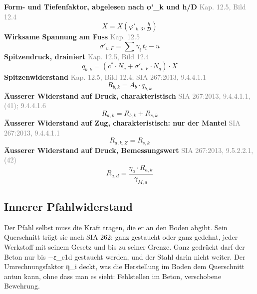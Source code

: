 \documentclass[11pt,a4paper]{article}
\newcommand{\normref}[1]{{\small\textcolor{gray}{#1}}}
\begin{document}
\noindent\textbf{Form- und Tiefenfaktor, abgelesen nach φ'\_k und h/D} \hfill \normref{Kap. 12.5, Bild 12.4}
\begin{equation*}
X = X\left(\varphi'_{k,3}, \tfrac{h}{D}\right)
\end{equation*}
\noindent\textbf{Wirksame Spannung am Fuss} \hfill \normref{Kap. 12.5}
\begin{equation*}
\sigma'_{v,F} = \sum \gamma_i \, t_i - u
\end{equation*}
\noindent\textbf{Spitzendruck, drainiert} \hfill \normref{Kap. 12.5, Bild 12.4}
\begin{equation*}
q_{b,k} = \left(c^{*} \cdot N_c + \sigma'_{v,F} \cdot N_q\right) \cdot X
\end{equation*}
\noindent\textbf{Spitzenwiderstand} \hfill \normref{Kap. 12.5, Bild 12.4; SIA 267:2013, 9.4.4.1.1}
\begin{equation*}
R_{b,k} = A_b \cdot q_{b,k}
\end{equation*}
\noindent\textbf{Äusserer Widerstand auf Druck, charakteristisch} \hfill \normref{SIA 267:2013, 9.4.4.1.1, (41); 9.4.4.1.6}
\begin{equation*}
R_{a,k} = R_{b,k} + R_{s,k}
\end{equation*}
\noindent\textbf{Äusserer Widerstand auf Zug, charakteristisch: nur der Mantel} \hfill \normref{SIA 267:2013, 9.4.4.1.1}
\begin{equation*}
R_{a,k,Z} = R_{s,k}
\end{equation*}
\noindent\textbf{Äusserer Widerstand auf Druck, Bemessungswert} \hfill \normref{SIA 267:2013, 9.5.2.2.1, (42)}
\begin{equation*}
R_{a,d} = \frac{\eta_a \cdot R_{a,k}}{\gamma_{M,a}}
\end{equation*}
\subsection{Innerer Pfahlwiderstand}
Der Pfahl selbst muss die Kraft tragen, die er an den Boden abgibt. Sein Querschnitt trägt sie nach SIA 262: ganz gestaucht oder ganz gedehnt, jeder Werkstoff mit seinem Gesetz und bis zu seiner Grenze. Ganz gedrückt darf der Beton nur bis −ε\_c1d gestaucht werden, und der Stahl darin nicht weiter. Der Umrechnungsfaktor η\_i deckt, was die Herstellung im Boden dem Querschnitt antun kann, ohne dass man es sieht: Fehlstellen im Beton, verschobene Bewehrung.
\end{document}
